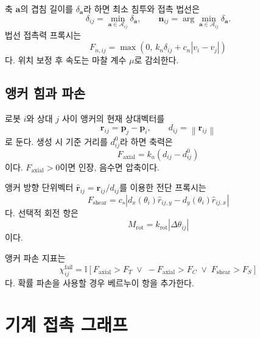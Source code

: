 \documentclass[11pt,a4paper]{article}
\newcommand{\I}{\mathbb{I}}
\newcommand{\norm}[1]{\left\lVert #1\right\rVert}
\begin{document}
축 \(\bm a\)의 겹침 길이를 \(\delta_{\bm a}\)라 하면 최소 침투와 접촉 법선은
\begin{equation}
  \delta_{ij}=\min_{\bm a\in\mathcal{A}_{ij}}\delta_{\bm a},
  \qquad
  \bm n_{ij}=
  \arg\min_{\bm a\in\mathcal{A}_{ij}}\delta_{\bm a}.
\end{equation}
법선 접촉력 프록시는
\begin{equation}
  F_{n,ij}=
  \max\!\left(
    0,\,
    k_n\delta_{ij}
    +c_n|v_i-v_j|
  \right)
  \label{eq:normal-force}
\end{equation}
다. 위치 보정 후 속도는 마찰 계수 \(\mu\)로 감쇠한다.

\subsection{앵커 힘과 파손}

로봇 \(i\)와 상대 \(j\) 사이 앵커의 현재 상대벡터를
\begin{equation}
  \bm r_{ij}=\bm p_j-\bm p_i,
  \qquad
  d_{ij}=\norm{\bm r_{ij}}
\end{equation}
로 둔다. 생성 시 기준 거리를 \(d_{ij}^0\)라 하면 축력은
\begin{equation}
  F_{\mathrm{axial}}=
  k_a(d_{ij}-d_{ij}^0)
\end{equation}
이다. \(F_{\mathrm{axial}}>0\)이면 인장, 음수면 압축이다.

앵커 방향 단위벡터
\(\widehat{\bm r}_{ij}=\bm r_{ij}/d_{ij}\)를 이용한 전단 프록시는
\begin{equation}
  F_{\mathrm{shear}}=
  c_s\left|
    d_x(\theta_i)\widehat r_{ij,y}
    -d_y(\theta_i)\widehat r_{ij,x}
  \right|
\end{equation}
다. 선택적 회전 항은
\begin{equation}
  M_{\mathrm{rot}}=k_{\mathrm{rot}}|\Delta\theta_{ij}|
\end{equation}
이다.

앵커 파손 지표는
\begin{equation}
  \chi_{ij}^{\mathrm{fail}}=
  \I\!\left[
    F_{\mathrm{axial}}>F_T
    \;\lor\;
    -F_{\mathrm{axial}}>F_C
    \;\lor\;
    F_{\mathrm{shear}}>F_S
  \right]
  \label{eq:anchor-failure}
\end{equation}
다. 확률 파손을 사용할 경우 베르누이 항을 추가한다.

\section{기계 접촉 그래프}
\end{document}
